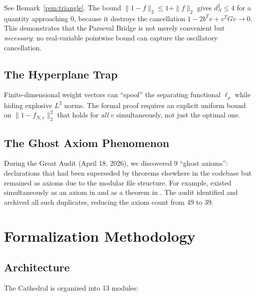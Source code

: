 \documentclass[11pt,a4paper]{article}
\begin{document}
See Remark~\ref{rem:triangle}. The bound $\|1 - f\|_2 \leq 1 + \|f\|_2$
gives $d_N^2 \leq 4$ for a quantity approaching $0$, because it
destroys the cancellation $1 - 2b^Tv + v^TGv \to 0$. This demonstrates
that the Parseval Bridge is not merely convenient but \emph{necessary}:
no real-variable pointwise bound can capture the oscillatory cancellation.

\subsection{The Hyperplane Trap}

Finite-dimensional weight vectors can ``spoof'' the separating
functional $\ell_\rho$ while hiding explosive $L^2$ norms. The formal
proof requires an explicit uniform bound on $\|1 - f_{N,v}\|_2^2$
that holds for \emph{all} $v$ simultaneously, not just the optimal one.

\subsection{The Ghost Axiom Phenomenon}

During the Great Audit (April 18, 2026), we discovered 9 ``ghost axioms'':
declarations that had been superseded by theorems elsewhere in the codebase
but remained as axioms due to the modular file structure. For example,
 existed simultaneously as an axiom in
 and as a theorem in
. The audit identified and archived all
such duplicates, reducing the axiom count from 49 to 39.

\section{Formalization Methodology}
\label{sec:methodology}

\subsection{Architecture}

The Cathedral is organized into 13 modules:
\end{document}
